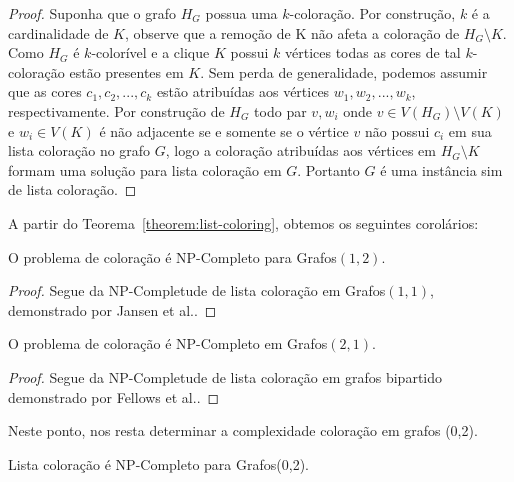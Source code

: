 \begin{proof}
Suponha que o grafo $H_G$ possua uma $k$-coloração. Por construção, $k$ é a cardinalidade de $K$, observe que a remoção de K não afeta a coloração de $H_G \setminus K$.
Como $H_G$ é $k$-colorível e a clique $K$ possui $k$ vértices todas as cores de tal $k$-coloração estão presentes em $K$. Sem perda de generalidade, podemos assumir que as cores $c_1,c_2,...,c_k$ estão atribuídas aos vértices $w_1,w_2,...,w_k$, respectivamente.
Por construção de $H_G$ todo par $v,w_i$ onde $v \in V(H_G) \setminus V(K)$ e $w_i \in V(K)$ é não adjacente se e somente se o vértice $v$ não possui $c_i$ em sua lista coloração no grafo $G$, logo a coloração atribuídas aos vértices em $H_G \setminus K$ formam uma solução para lista coloração em $G$. Portanto $G$ é uma instância sim de lista coloração.
\end{proof}


A partir do Teorema~\ref{theorem:list-coloring}, obtemos os seguintes corolários:

\begin{corolario}
O problema de coloração é NP-Completo para Grafos$(1,2)$.
\end{corolario}

\begin{proof}
Segue da NP-Completude de lista coloração em Grafos$(1,1)$, demonstrado por Jansen et al.\cite{jansen1997}.
\end{proof}


\begin{corolario}
O problema de coloração é NP-Completo em Grafos$(2,1)$.
\end{corolario}

\begin{proof}
Segue da NP-Completude de lista coloração em grafos bipartido demonstrado por Fellows et al.\cite{fellows07}.
\end{proof}

Neste ponto, nos resta determinar a complexidade coloração em grafos (0,2).


\begin{teorema} \label{teorema:lista-2}
Lista coloração é NP-Completo para Grafos(0,2).
\end{teorema}

